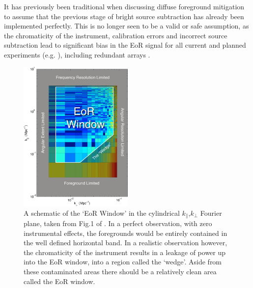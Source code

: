 It has previously been traditional when discussing diffuse foreground mitigation to assume that the previous stage of bright source subtraction has already been implemented perfectly. This is no longer seen to be a valid or safe assumption, as the chromaticity of the instrument, calibration errors and incorrect source subtraction lead to significant bias in the EoR signal for all current and planned experiments (e.g. \citet{ EW2017MNRAS.470.1849E,Procopio2017PASA...34...33P,Barry2016MNRAS.461.3135B,Patil2016MNRAS.463.4317P,Datta2010ApJ...724..526D,Liu2009MNRAS.394.1575L}), including redundant arrays \citep{Byrne2019ApJ...875...70B}. 

\begin{figure}
\begin{center}
    \includegraphics[width=0.5\textwidth]{medium.png}
\end{center}
    \caption{A schematic of the `EoR Window' in the cylindrical $k_{\parallel}$,$k_{\perp}$ Fourier plane, taken from Fig.1 of \citet{Dillon2014PhRvD..89b3002D}. In a perfect observation, with zero instrumental effects, the foregrounds would be entirely contained in the well defined horizontal band. In a realistic observation however, the chromaticity of the instrument results in a leakage of power up into the EoR window, into a region called the `wedge'. Aside from these contaminated areas there should be a relatively clean area called the EoR window.}
    \label{fig:window_liu}
\end{figure}

